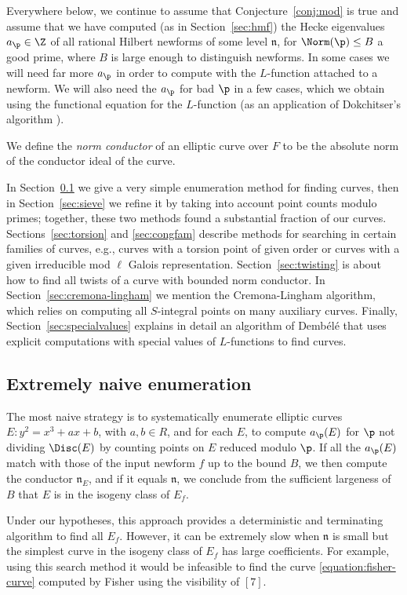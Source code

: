 \documentclass{amsart}
\newcommand{\n}{\mathfrak{n}}
\newcommand{\dembele}{Demb\'el{\'e}\xspace}
\begin{document}
Everywhere below, we continue to assume that Conjecture~\ref{conj:mod}
is true and assume that we have computed (as in Section~\ref{sec:hmf})
the Hecke eigenvalues $a_\p\in \Z$ of all rational Hilbert newforms of
some level $\n$, for $\Norm(\p)\leq B$ a good prime, where $B$ is
large enough to distinguish newforms. In some cases we will need far
more $a_{\p}$ in order to compute with the $L$-function attached to a
newform.  We will also need the $a_{\p}$ for bad $\p$ in a few cases,
which we obtain using the functional equation for the $L$-function (as
an application of Dokchitser's algorithm \cite{dokchitser:lfun}).

We define the {\em norm conductor} of an elliptic curve over $F$ to be
the absolute norm of the conductor ideal of the curve.

In Section~\ref{sec:naive} we give a very simple enumeration method
for finding curves, then in Section~\ref{sec:sieve} we refine it by
taking into account point counts modulo primes; together, these two
methods found a substantial fraction of our curves.
Sections~\ref{sec:torsion} and \ref{sec:congfam} describe methods for
searching in certain families of curves, e.g., curves with a torsion
point of given order or curves with a given irreducible mod $\ell$
Galois representation.  Section~\ref{sec:twisting} is about how to
find all twists of a curve with bounded norm conductor.  In
Section~\ref{sec:cremona-lingham} we mention the Cremona-Lingham
algorithm, which relies on computing all $S$-integral points on many
auxiliary curves.  Finally, Section~\ref{sec:specialvalues} explains
in detail an algorithm of \dembele{} that uses  explicit
computations with special values of $L$-functions to find curves.


\subsection{Extremely naive enumeration}\label{sec:naive}

The most naive strategy is to systematically enumerate 
 elliptic curves $E: y^2 = x^3 + ax + b$, with $a,b\in R$,
and for each $E$, to compute $a_\p(E)$ for $\p$ not dividing $\Disc(E)$
 by counting points on $E$ reduced modulo $\p$.  If all the $a_\p(E)$ match
 with those of the input newform $f$ up to the bound $B$, we then compute
 the conductor $\n_E$, and if it equals $\n$, we conclude from the sufficient 
largeness of $B$ that $E$ is in the isogeny class of $E_f$.

Under our hypotheses, this approach provides a deterministic and 
terminating algorithm to find all $E_f$. However, it can be extremely slow
 when $\n$ is small but the simplest curve in the isogeny class 
of $E_f$ has large coefficients.  For example, using this search method it would be infeasible to find the curve \eqref{equation:fisher-curve}
computed by Fisher using the visibility of \Sha$[7]$.
\end{document}
